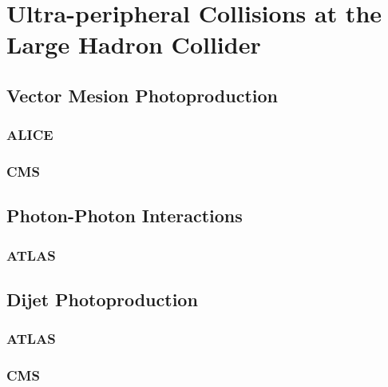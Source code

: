 
\chapter{Ultra-peripheral Collisions at the Large Hadron Collider}

\section{Vector Mesion Photoproduction}

\subsection{ALICE}

\subsection{CMS}

\section{Photon-Photon Interactions}

\subsection{ATLAS}

\section{Dijet Photoproduction}

\subsection{ATLAS}

\subsection{CMS}

